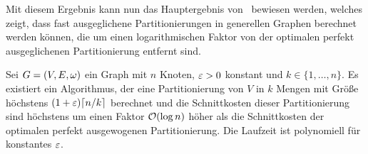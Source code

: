 Mit diesem Ergebnis kann nun das Hauptergebnis von~\parencite{FF15} bewiesen werden, welches zeigt, dass fast ausgeglichene Partitionierungen in generellen Graphen berechnet werden können, die um einen logarithmischen Faktor von der optimalen perfekt ausgeglichenen Partitionierung entfernt sind.

\begin{thm}
    Sei $G = (V, E, \omega)$ ein Graph mit $n$ Knoten, $\varepsilon > 0$ konstant und $k \in \{1, \ldots, n\}$. Es existiert ein Algorithmus, der eine Partitionierung von $V$ in $k$ Mengen mit Größe höchstens $(1 + \eps) \ceil*{n/k}$ berechnet und die Schnittkosten dieser Partitionierung sind höchstens um einen Faktor $\mathcal{O}(\log n)$ höher als die Schnittkosten der optimalen perfekt ausgewogenen Partitionierung.
    Die Laufzeit ist polynomiell für konstantes $\varepsilon$.
\end{thm}
